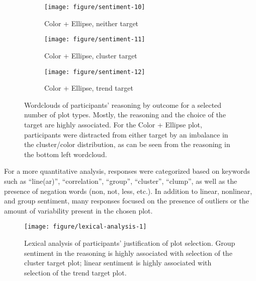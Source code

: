 \documentclass[12pt]{article}\usepackage[]{graphicx}\usepackage[]{color}
\newenvironment{knitrout}{}{} %
\begin{document}
\begin{figure}[ht]
\begin{subfigure}[t]{0.25\linewidth}
  \caption{Color + Ellipse, neither target}\vspace{-0.2in}
  \texttt{[image: figure/sentiment-10]}
\end{subfigure}
\begin{subfigure}[t]{0.25\linewidth}
  \caption{Color + Ellipse, cluster target}\vspace{-0.2in}
  \texttt{[image: figure/sentiment-11]}
\end{subfigure}
\begin{subfigure}[t]{0.25\linewidth}
  \caption{Color + Ellipse, trend target}\vspace{-0.2in}
  \texttt{[image: figure/sentiment-12]}
\end{subfigure}
\caption[Wordclouds of participant responses for selected plot types]{\label{fig:wordles}Wordclouds of participants' reasoning by outcome for a selected number of plot types. Mostly, the reasoning and the choice of the target are highly associated. For the Color + Ellipse plot, participants were distracted from either target by an imbalance in the cluster/color distribution, as can be seen from the reasoning in the bottom left wordcloud.}
\end{figure}
\afterpage{\clearpage}
For a more quantitative analysis, responses were categorized based on keywords such as ``line(ar)'', ``correlation'', ``group'', ``cluster'', ``clump'', as well as the presence of negation words (non, not, less, etc.). In addition to linear, nonlinear, and group sentiment, many responses focused on the presence of outliers or the amount of variability present in the chosen plot. 
\begin{figure}[ht]\centering
\begin{knitrout}
\color{fgcolor}

{\centering \texttt{[image: figure/lexical-analysis-1]} 

}



\end{knitrout}
\caption[Lexical analysis of participant reasoning]{Lexical analysis of participants' justification of plot selection. Group sentiment in the reasoning is highly associated with selection of the cluster target plot; linear sentiment is highly associated with selection of the trend target plot.}\label{fig:lexicalanalysis}
\end{figure}
\end{document}
